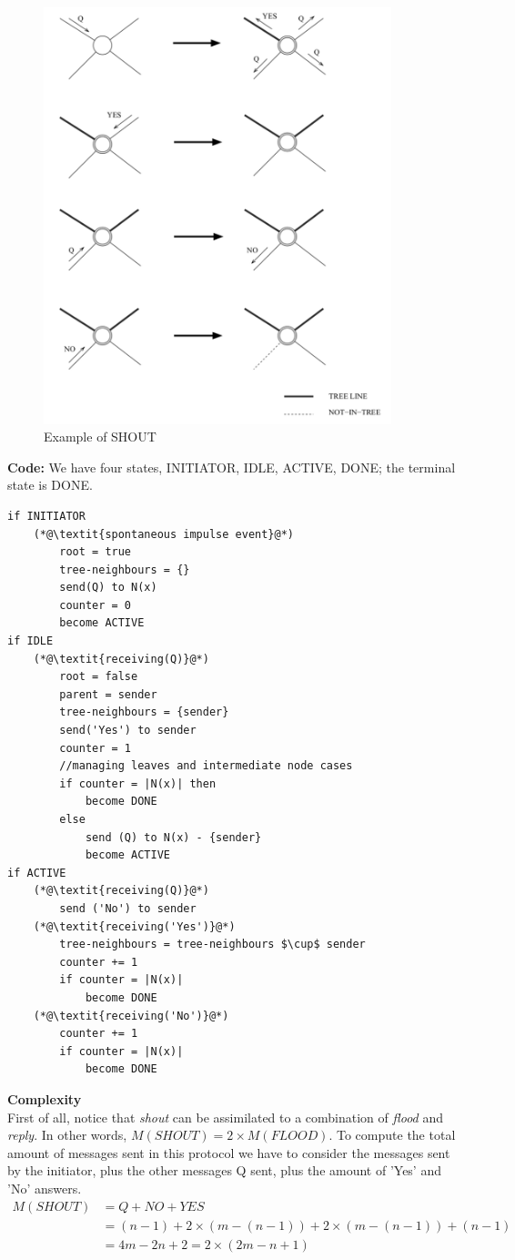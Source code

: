\documentclass[paper=a4, fontsize=11pt]{scrartcl} %
\numberwithin{equation}{section} %
\numberwithin{figure}{section} %
\numberwithin{table}{section} %
\begin{document}
\begin{figure}[H]
  \centering
  \includegraphics[width=0.9\textwidth]{img/shout.png}
  \caption{Example of SHOUT}
  \label{fig:boat1}
\end{figure}
\newpage
\textbf{Code:} We have four states, INITIATOR, IDLE, ACTIVE, DONE; the terminal state is DONE.
\begin{lstlisting}
if INITIATOR
	(*@\textit{spontaneous impulse event}@*)
		root = true
		tree-neighbours = {}
		send(Q) to N(x)
		counter = 0
		become ACTIVE
if IDLE
	(*@\textit{receiving(Q)}@*)
		root = false
		parent = sender
		tree-neighbours = {sender}
		send('Yes') to sender
		counter = 1
		//managing leaves and intermediate node cases
		if counter = |N(x)| then
			become DONE
		else
			send (Q) to N(x) - {sender}
			become ACTIVE			 
if ACTIVE
	(*@\textit{receiving(Q)}@*)
		send ('No') to sender
	(*@\textit{receiving('Yes')}@*)
		tree-neighbours = tree-neighbours $\cup$ sender
		counter += 1
		if counter = |N(x)|
			become DONE
	(*@\textit{receiving('No')}@*)
		counter += 1
		if counter = |N(x)|
			become DONE			
\end{lstlisting}
\textbf{Complexity} \\
First of all, notice that \textit{shout} can be assimilated to a combination of \textit{flood} and \textit{reply}. In other words, $M(SHOUT) = 2	\times M(FLOOD)$.
To compute the total amount of messages sent in this protocol we have to consider the messages sent by the initiator, plus the other messages Q sent, plus the amount of 'Yes' and 'No' answers.
\begin{align*}
	M(SHOUT) &= Q + NO  + YES \\ 
	&= (n-1)+ 2\times(m-(n-1)) + 2\times(m-(n-1)) + (n-1) \\
	&= 4m - 2n + 2 = 2\times(2m-n+1)
\end{align*}
\end{document}
